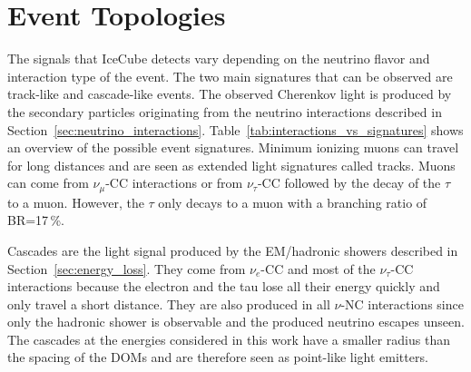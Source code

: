 \section{Event Topologies} \label{sec:event_topologies}

The signals that IceCube detects vary depending on the neutrino flavor and interaction type of the event.
The two main signatures that can be observed are track-like and cascade-like events.
The observed Cherenkov light is produced by the secondary particles originating from the neutrino interactions described in Section~\ref{sec:neutrino_interactions}.
Table~\ref{tab:interactions_vs_signatures} shows an overview of the possible event signatures.
Minimum ionizing muons can travel for long distances and are seen as extended light signatures called tracks.
Muons can come from $\nu_\mu$-CC interactions or from $\nu_\tau$-CC followed by the decay of the $\tau$ to a muon.
However, the $\tau$ only decays to a muon with a branching ratio of BR=17\,\%.

Cascades are the light signal produced by the EM/hadronic showers described in Section~\ref{sec:energy_loss}.
They come from $\nu_e$-CC and most of the $\nu_\tau$-CC interactions because the electron and the tau lose all their energy quickly and only travel a short distance.
They are also produced in all $\nu$-NC interactions since only the hadronic shower is observable and the produced neutrino escapes unseen.
The cascades at the energies considered in this work have a smaller radius than the spacing of the DOMs and are therefore seen as point-like light emitters.

